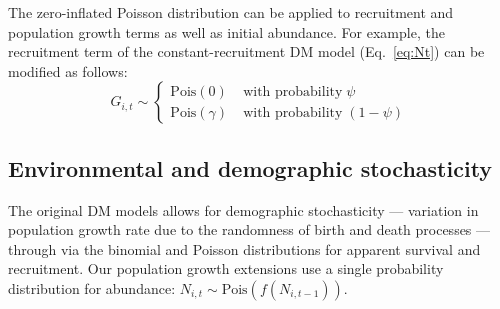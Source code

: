 \documentclass[12pt]{article}
\begin{document}


The zero-inflated Poisson distribution can be applied to recruitment and 
population growth terms as well as initial abundance. For example, 
the recruitment term of the constant-recruitment DM model
(Eq.~\ref{eq:Nt}) can be modified as follows:
\begin{equation}
G_{i,t} \sim \left\{
\begin{aligned}
\mathrm{Pois}(0) &\; \text{with probability} \; \psi \\
\mathrm{Pois}(\gamma) &\; \text{with probability} \; (1-\psi)\end{aligned} \right.
\label{eq:ZIPts}
\end{equation}


\subsection{Environmental and demographic stochasticity}

The original DM models allows for demographic stochasticity --- variation in population growth 
rate due to the randomness of birth and death processes --- through %
via the binomial and Poisson distributions for apparent survival and recruitment.  Our population
growth extensions use a single probability distribution for abundance: $N_{i,t} \sim 
\mathrm{Pois}(f(N_{i,t-1}))$.  
\end{document}
